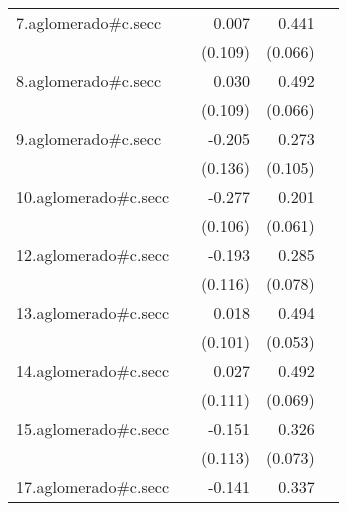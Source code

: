 {\begin{longtable}{l*{4}{D{.}{.}{-1}}}
\addlinespace
7.aglomerado#c.secc&                     &       0.007         &       0.441\sym{***}&                     \\
            &                     &     (0.109)         &     (0.066)         &                     \\
\addlinespace
8.aglomerado#c.secc&                     &       0.030         &       0.492\sym{***}&                     \\
            &                     &     (0.109)         &     (0.066)         &                     \\
\addlinespace
9.aglomerado#c.secc&                     &      -0.205         &       0.273\sym{**} &                     \\
            &                     &     (0.136)         &     (0.105)         &                     \\
\addlinespace
10.aglomerado#c.secc&                     &      -0.277\sym{**} &       0.201\sym{**} &                     \\
            &                     &     (0.106)         &     (0.061)         &                     \\
\addlinespace
12.aglomerado#c.secc&                     &      -0.193         &       0.285\sym{***}&                     \\
            &                     &     (0.116)         &     (0.078)         &                     \\
\addlinespace
13.aglomerado#c.secc&                     &       0.018         &       0.494\sym{***}&                     \\
            &                     &     (0.101)         &     (0.053)         &                     \\
\addlinespace
14.aglomerado#c.secc&                     &       0.027         &       0.492\sym{***}&                     \\
            &                     &     (0.111)         &     (0.069)         &                     \\
\addlinespace
15.aglomerado#c.secc&                     &      -0.151         &       0.326\sym{***}&                     \\
            &                     &     (0.113)         &     (0.073)         &                     \\
\addlinespace
17.aglomerado#c.secc&                     &      -0.141         &       0.337\sym{***}&                     \\

\end{longtable}}
